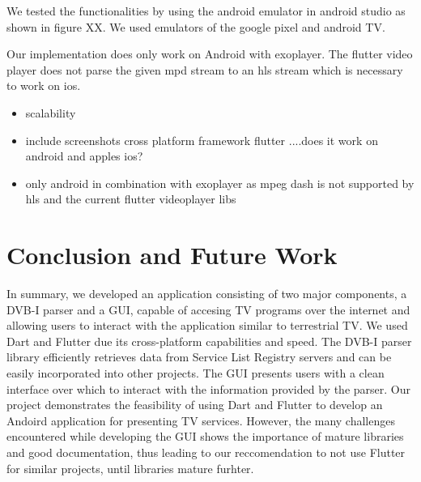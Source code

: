 \documentclass[conference]{IEEEtran}
\begin{document}


We tested the functionalities by using the android emulator in android studio as shown in figure XX. We used emulators of the  google pixel and android TV. 


Our implementation does only work on Android with exoplayer. The flutter video player does not parse the given mpd stream to an hls stream which is necessary to work on ios.



\begin{itemize}
	\item scalability
	\item include screenshots cross platform framework flutter ....does it work on android and apples ios?
	\item only android in combination with exoplayer as mpeg dash is not supported by hls and the current flutter videoplayer libs
\end{itemize}




\section{Conclusion and Future Work}
In summary, we developed an application consisting of two major components, a DVB-I parser and a GUI, capable of accesing TV programs over the internet and allowing users to interact with the application similar to terrestrial TV.  We used Dart and Flutter due its cross-platform capabilities and speed. The DVB-I parser library efficiently retrieves data from Service List Registry servers and can be easily incorporated into other projects. The GUI presents users with a clean interface over which to interact with the information provided by the parser. Our project demonstrates the feasibility of using Dart and Flutter to develop an Andoird application for presenting TV services. However, the many challenges encountered while developing the GUI shows the importance of mature libraries and good documentation, thus leading to our reccomendation to not use Flutter for similar projects, until libraries mature furhter. \\\par
\end{document}
